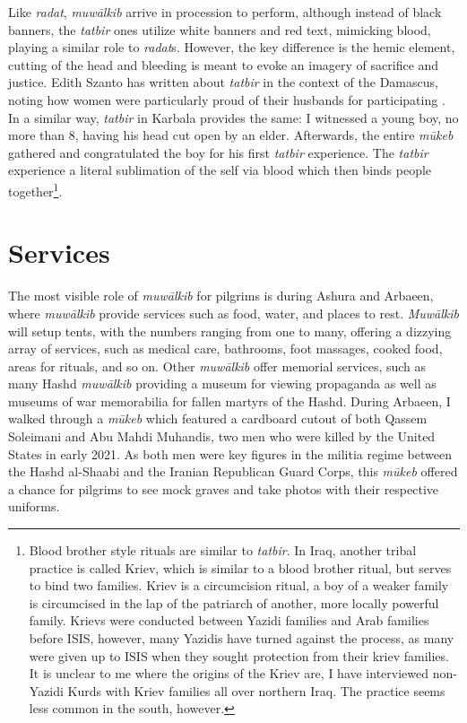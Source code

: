 Like \emph{radat}, \emph{muwālkib} arrive in procession to perform, although instead of black banners, the \emph{tatbir} ones utilize white banners and red text, mimicking blood, playing a similar role to \emph{radat}s. However, the key difference is the hemic element, cutting of the head and bleeding is meant to evoke an imagery of sacrifice and justice. Edith Szanto has written about \emph{tatbir} in the context of the Damascus, noting how women were particularly proud of their husbands for participating \cite[86]{szanto_beyond_2013}. In a similar way, \emph{tatbir} in Karbala provides the same: I witnessed a young boy, no more than 8, having his head cut open by an elder. Afterwards, the entire \emph{mūkeb} gathered and congratulated the boy for his first \emph{tatbir} experience. The \emph{tatbir} experience a literal sublimation of the self via blood which then binds people together\footnote{Blood brother style rituals are similar to \emph{tatbir}. In Iraq, another tribal practice is called Kriev, which is similar to a blood brother ritual, but serves to bind two families. Kriev is a circumcision ritual, a boy of a weaker family is circumcised in the lap of the patriarch of another, more locally powerful family. Krievs were conducted between Yazidi families and Arab families before ISIS, however, many Yazidis have turned against the process, as many were given up to ISIS when they sought protection from their kriev families. It is unclear to me where the origins of the Kriev are, I have interviewed non-Yazidi Kurds with Kriev families all over northern Iraq. The practice seems less common in the south, however.}. 

\section{Services}
The most visible role of \emph{muwālkib} for pilgrims is during Ashura and Arbaeen, where \emph{muwālkib} provide services such as food, water, and places to rest. \emph{Muwālkib} will setup tents, with the numbers ranging from one to many, offering a dizzying array of services, such as medical care, bathrooms, foot massages, cooked food, areas for rituals, and so on. Other \emph{muwālkib} offer memorial services, such as many Hashd \emph{muwālkib} providing a museum for viewing propaganda as well as museums of war memorabilia for fallen martyrs of the Hashd. During Arbaeen, I walked through a \emph{mūkeb} which featured a cardboard cutout of both Qassem Soleimani and Abu Mahdi Muhandis, two men who were killed by the United States in early 2021. As both men were key figures in the militia regime between the Hashd al-Shaabi and the Iranian Republican Guard Corps, this \emph{mūkeb} offered a chance for pilgrims to see mock graves and take photos with their respective uniforms. 

